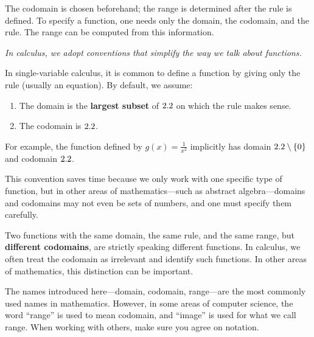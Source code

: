 \begin{remark}
The codomain is chosen beforehand; the range is determined after the rule is defined.  To specify a function, one needs only the domain, the codomain, and the rule.  The range can be computed from this information.
\end{remark}

\textit{In calculus, we adopt conventions that simplify the way we talk about functions.}

\begin{remark}
In single-variable calculus, it is common to define a function by giving only the rule (usually an equation).  By default, we assume:
\begin{enumerate}[label=(\roman*)]
  \item The domain is the \textbf{largest subset} of $2.2$ on which the rule makes sense.
  \item The codomain is $2.2$.
\end{enumerate}
For example, the function defined by $g(x) = \frac{1}{x^{2}}$ implicitly has domain $2.2 \setminus \{0\}$ and codomain $2.2$.
\end{remark}

\begin{remark}[Warning]
This convention saves time because we only work with one specific type of function, but in other areas of mathematics---such as abstract algebra---domains and codomains may not even be sets of numbers, and one must specify them carefully.
\end{remark}

\begin{remark}
Two functions with the same domain, the same rule, and the same range, but \textbf{different codomains}, are strictly speaking different functions.  In calculus, we often treat the codomain as irrelevant and identify such functions.  In other areas of mathematics, this distinction can be important.
\end{remark}

\begin{remark}
The names introduced here---domain, codomain, range---are the most commonly used names in mathematics.  However, in some areas of computer science, the word ``range'' is used to mean codomain, and ``image'' is used for what we call range.  When working with others, make sure you agree on notation.
\end{remark}

